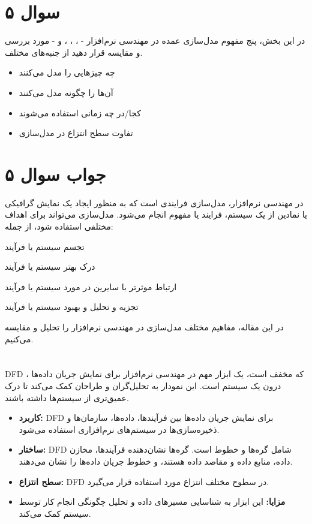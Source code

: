 \section*{سوال ۵}

در این بخش، پنج مفهوم مدل‌سازی عمده در مهندسی نرم‌افزار -
،
،
،
و
- مورد بررسی و مقایسه قرار دهید از جنبه‌های مختلف.

\begin{itemize}
	\item چه چیزهایی را مدل می‌کنند
	\item آن‌ها را چگونه مدل می‌کنند
	\item کجا/در چه زمانی استفاده می‌شوند
	\item تفاوت سطح انتزاع در مدل‌سازی
\end{itemize}

\section*{جواب سوال ۵}

در مهندسی نرم‌افزار، مدل‌سازی فرایندی است که به منظور ایجاد یک نمایش گرافیکی یا نمادین از یک سیستم، فرایند یا مفهوم انجام می‌شود. مدل‌سازی می‌تواند برای اهداف مختلفی استفاده شود، از جمله:

تجسم سیستم یا فرآیند

درک بهتر سیستم یا فرآیند

ارتباط موثرتر با سایرین در مورد سیستم یا فرآیند

تجزیه و تحلیل و بهبود سیستم یا فرآیند

در این مقاله، مفاهیم مختلف مدل‌سازی در مهندسی نرم‌افزار را تحلیل و مقایسه می‌کنیم.

\section*{}
DFD ، که مخفف  است، یک ابزار مهم در مهندسی نرم‌افزار برای نمایش جریان داده‌ها درون یک سیستم است. این نمودار به تحلیل‌گران و طراحان کمک می‌کند تا درک عمیق‌تری از سیستم‌ها داشته باشند.

\begin{itemize}
	\item \textbf{کاربرد:} DFD برای نمایش جریان داده‌ها بین فرآیندها، داده‌ها، سازمان‌ها و ذخیره‌سازی‌ها در سیستم‌های نرم‌افزاری استفاده می‌شود.
	\item \textbf{ساختار:} DFD شامل گره‌ها و خطوط است. گره‌ها نشان‌دهنده فرآیندها، مخازن داده، منابع داده و مقاصد داده هستند، و خطوط جریان داده‌ها را نشان می‌دهند.
	\item \textbf{سطح انتزاع:} DFD در سطوح مختلف انتزاع مورد استفاده قرار می‌گیرد.
	\item \textbf{مزایا:} این ابزار به شناسایی مسیرهای داده و تحلیل چگونگی انجام کار توسط سیستم کمک می‌کند.
\end{itemize}

